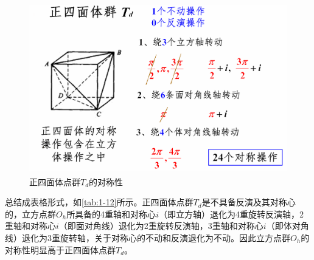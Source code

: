     \begin{figure}[!htbp]
        \centering    
        \includegraphics[height=20em, keepaspectratio=true]{pic/1-45}
        \caption{正四面体点群$T_d$的对称性}
        \label{fig:1-15}
    \end{figure}

    总结成表格形式，如\autoref{tab:1-12}所示。正四面体点群$T_d$是不具备反演及其对称心的，立方点群$O_h$所具备的4重轴和对称心$i$（即立方轴）退化为4重旋转反演轴，2重轴和对称心$i$（即面对角线）退化为2重旋转反演轴，3重轴和对称心$i$（即体对角线）退化为3重旋转轴，关于对称心的不动和反演退化为不动。因此立方点群$O_h$的对称性明显高于正四面体点群$T_d$。
    \begin{table}[!htbp]
        \centering
        \caption{正四面体点群的对称性}
        \label{tab:1-12}
    \end{table}

